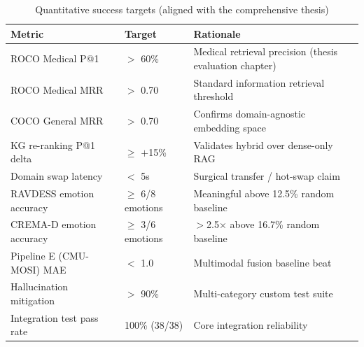 \documentclass[12pt, a4paper]{article}
\begin{document}
\begin{table}[h!]
\centering
\caption{Quantitative success targets (aligned with the comprehensive thesis)}
\label{tab:targets}
\renewcommand{\arraystretch}{1.3}
\begin{tabularx}{\textwidth}{@{}p{5.5cm} p{2.8cm} p{5.0cm}@{}}
\toprule
\textbf{Metric} & \textbf{Target} & \textbf{Rationale} \\
\midrule
ROCO Medical P@1            & $>$ 60\%     & Medical retrieval precision (thesis evaluation chapter) \\
ROCO Medical MRR            & $>$ 0.70     & Standard information retrieval threshold \\
COCO General MRR            & $>$ 0.70     & Confirms domain-agnostic embedding space \\
KG re-ranking P@1 delta     & $\geq$ $+$15\%  & Validates hybrid over dense-only RAG \\
Domain swap latency         & $<$ 5s       & Surgical transfer / hot-swap claim \\
RAVDESS emotion accuracy    & $\geq$ 6/8 emotions & Meaningful above 12.5\% random baseline \\
CREMA-D emotion accuracy    & $\geq$ 3/6 emotions & $>$2.5$\times$ above 16.7\% random baseline \\
Pipeline E (CMU-MOSI) MAE   & $<$ 1.0      & Multimodal fusion baseline beat \\
Hallucination mitigation    & $>$ 90\%     & Multi-category custom test suite \\
Integration test pass rate  & 100\% (38/38)& Core integration reliability \\
\bottomrule
\end{tabularx}
\end{table}



\end{document}
